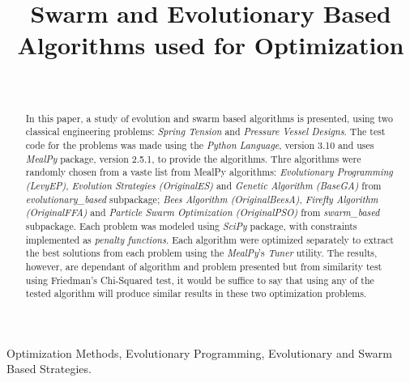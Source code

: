 \documentclass[conference]{IEEEtran}
\begin{document}
\title{Swarm and Evolutionary Based Algorithms used for Optimization}
\author{
	\\
}

\maketitle


\begin{abstract}
    In this paper, a study of evolution and swarm based algorithms is presented,
    using two classical engineering problems: \textit{Spring Tension} and \textit{Pressure Vessel
    Designs}. The test code for the problems was made using the \textit{Python Language},
    version 3.10 and uses \textit{MealPy} package, version 2.5.1,  to provide the algorithms.
    Thre algorithms were randomly chosen from a vaste list from MealPy algorithms:
    \textit{Evolutionary Programming (LevyEP)}, \textit{Evolution Strategies (OriginalES)} and
    \textit{Genetic Algorithm (BaseGA)} from \textit{evolutionary\_based} subpackage;
    \textit{Bees Algorithm (OriginalBeesA)}, \textit{Firefly Algorithm (OriginalFFA)} and
    \textit{Particle Swarm Optimization (OriginalPSO)} from \textit{swarm\_based} subpackage.
    Each problem was modeled using \textit{SciPy} package, with constraints implemented as
    \textit{penalty functions}. Each algorithm were optimized separately to extract the best
    solutions from each problem using the \textit{MealPy}'s \textit{Tuner} utility.
    The results, however, are dependant of algorithm and problem presented but from
    similarity test using Friedman's Chi-Squared test, it would be suffice to say that using any
    of the tested algorithm will produce similar results in these two optimization problems.
\end{abstract}

\begin{IEEEkeywords}
	Optimization Methods, Evolutionary Programming, Evolutionary and Swarm Based Strategies.
\end{IEEEkeywords}
\end{document}

